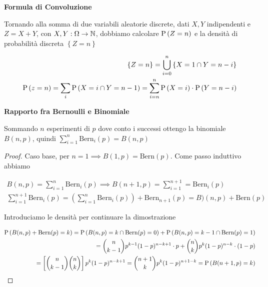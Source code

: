 \begin{defn}
	\textbf{Formula di Convoluzione}
	
	Tornando alla somma di due variabili aleatorie discrete, dati $ X,Y $ indipendenti e $ Z = X + Y $, con $ X,Y : \Omega \to \mathbb{N} $, dobbiamo calcolare $ \text{P}\left(Z = n\right) $ e la densità di probabilità discreta $ \left\{Z = n\right\} $
	
	\begin{equation*}
	\begin{aligned}
	\left\{Z = n\right\} = \bigcup_{i=0}^{n} \left\{X = 1 \cap Y = n - i \right\} \\
	\text{P}\left(z=n\right) = \sum_{i} \text{P}\left(X = i \cap Y = n-1\right) = \sum_{i = n}^{n} \text{P}\left(X=i\right) \cdot \text{P}\left(Y=n-i\right)
	\end{aligned} 
	\end{equation*}
\end{defn}

\begin{thm}
	\textbf{Rapporto fra Bernoulli e Binomiale}
	
	Sommando $ n $ esperimenti di $ p $ dove conto i successi ottengo la binomiale $ B(n,p) $, quindi $ \sum_{i=1}^{n} \text{Bern}_i(p) = B(n,p) $
	
	\begin{proof}
		Caso base, per $ n = 1 \implies B(1,p) = \text{Bern}(p)$. Come passo induttivo abbiamo 
		
		\begin{equation*}
		\begin{aligned}
		B(n,p) = \sum_{i=1}^{n} \text{Bern}_i(p) \implies B(n+1,p) = \sum_{i=1}^{n+1} = \text{Bern}_i(p) \\
		\sum_{i=1}^{n+1} \text{Bern}_i(p) = \left( \sum_{i=1}^{n} \text{Bern}_i(p) \right) + \text{Bern}_{n+1}(p) = B)(n,p) + \text{Bern}(p)
		\end{aligned}
		\end{equation*}
		
		Introduciamo le densità per continuare la dimostrazione
		
		\begin{equation*}
		\begin{aligned}
		\text{P}\left(B(n,p) + \text{Bern}(p) = k\right) = \text{P}\left(B(n,p) = k \cap \text{Bern}(p) = 0\right) + \text{P}\left(B(n,p) = k-1 \cap \text{Bern}(p) = 1\right) \\
		= \binom{n}{k-1}p^{k-1}(1-p)^{n-k+1} \cdot p + \binom{n}{k}p^k(1-p)^{n-k} \cdot  (1-p) \\
		= \left[\binom{n}{k-1}\binom{n}{k}\right] p^k (1-p)^{n-k+1} = \binom{n+1}{k} p^k (1-p)^{n+1-k} = \text{P}\left(B(n+1,p) = k\right)
		\end{aligned}
		\end{equation*}
	\end{proof}
	

\end{thm}


